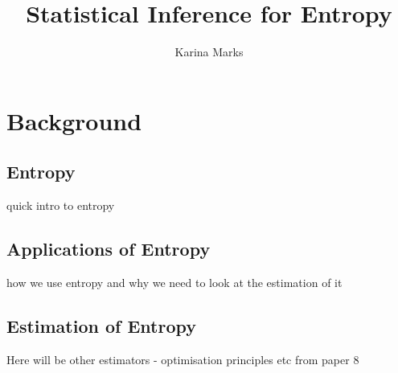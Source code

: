 \documentclass{article}
\title{Statistical Inference for Entropy}
\author{Karina Marks}
\begin{document}
\section{Background}

\subsection{Entropy}

quick intro to entropy

\subsection{Applications of Entropy}

how we use entropy and why we need to look at the estimation of it

\subsection{Estimation of Entropy}

Here will be other estimators - optimisation principles etc from paper 8
\end{document}
